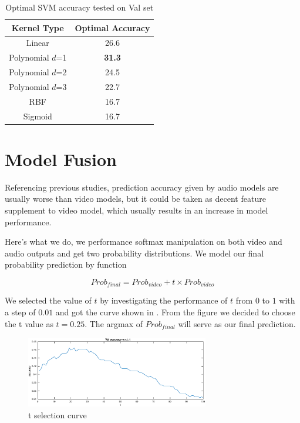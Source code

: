 \documentclass[10pt,twocolumn,letterpaper]{article}
\begin{document}
\begin{table}[htpb]
   \begin{center}
      \begin{tabular}{|c|c|}
         \hline
         \textbf{Kernel Type} & \textbf{Optimal Accuracy}\\
         \hline\hline
         Linear & 26.6\\
         \hline
         Polynomial $d$=1 & \textbf{31.3} \\
         \hline
         Polynomial $d$=2 & 24.5 \\
         \hline
         Polynomial $d$=3 & 22.7 \\
         \hline
         RBF & 16.7 \\
         \hline
         Sigmoid & 16.7 \\
         \hline
      \end{tabular}
   \end{center}
   \caption{Optimal SVM accuracy tested on Val set}
   \label{tableSVM}
\end{table}

\section{Model Fusion}

Referencing previous studies, prediction accuracy given by audio models are usually worse than video models, but it could be taken as decent feature supplement to video model, which usually results in an increase in model performance.

Here's what we do, we performance softmax manipulation on both video and audio outputs and get two probability distributions. We model our final probability prediction by function

\begin{equation}
Prob_{final} = Prob_{video} + t \times Prob_{video} 
\end{equation}

We selected the value of $t$ by investigating the performance of $t$ from $0$ to $1$ with a step of $0.01$ and got the curve shown in . From the figure we decided to choose the t value as $t=0.25$. The argmax of $Prob_{final}$ will serve as our final prediction.

\begin{figure}[t]
	\centering
	\includegraphics[width = 8cm]{pic/t_selection.eps}
	\caption{t selection curve}
\end{figure}
\end{document}
